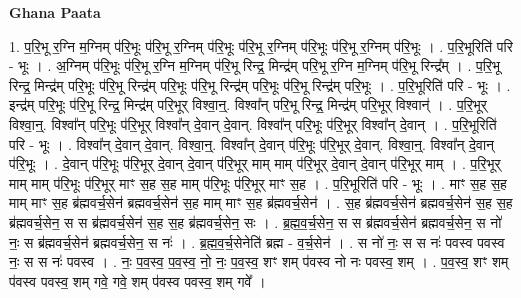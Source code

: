\documentclass[17pt]{extarticle}
\begin{document}
\textbf{Ghana Paata } \newline

1. प॒रि॒भू र॒ग्नि म॒ग्निम् प॑रि॒भूः प॑रि॒भू र॒ग्निम् प॑रि॒भूः प॑रि॒भू र॒ग्निम् प॑रि॒भूः प॑रि॒भू र॒ग्निम् प॑रि॒भूः । . प॒रि॒भूरिति॑ परि - भूः । . अ॒ग्निम् प॑रि॒भूः प॑रि॒भू र॒ग्नि म॒ग्निम् प॑रि॒भू रिन्द्र॒ मिन्द्र॑म् परि॒भू र॒ग्नि म॒ग्निम् प॑रि॒भू रिन्द्र᳚म् । . प॒रि॒भू रिन्द्र॒ मिन्द्र॑म् परि॒भूः प॑रि॒भू रिन्द्र॑म् परि॒भूः प॑रि॒भू रिन्द्र॑म् परि॒भूः प॑रि॒भू रिन्द्र॑म् परि॒भूः । . प॒रि॒भूरिति॑ परि - भूः । . इन्द्र॑म् परि॒भूः प॑रि॒भू रिन्द्र॒ मिन्द्र॑म् परि॒भूर् विश्वा॒न्॒. विश्वा᳚न् परि॒भू रिन्द्र॒ मिन्द्र॑म् परि॒भूर् विश्वान्॑ । . प॒रि॒भूर् विश्वा॒न्॒. विश्वा᳚न् परि॒भूः प॑रि॒भूर् विश्वा᳚न् दे॒वान् दे॒वान्. विश्वा᳚न् परि॒भूः प॑रि॒भूर् विश्वा᳚न् दे॒वान् । . प॒रि॒भूरिति॑ परि - भूः । . विश्वा᳚न् दे॒वान् दे॒वान्. विश्वा॒न्॒. विश्वा᳚न् दे॒वान् प॑रि॒भूः प॑रि॒भूर् दे॒वान्. विश्वा॒न्॒. विश्वा᳚न् दे॒वान् प॑रि॒भूः । . दे॒वान् प॑रि॒भूः प॑रि॒भूर् दे॒वान् दे॒वान् प॑रि॒भूर् माम् माम् प॑रि॒भूर् दे॒वान् दे॒वान् प॑रि॒भूर् माम् । . प॒रि॒भूर् माम् माम् प॑रि॒भूः प॑रि॒भूर् माꣳ स॒ह स॒ह माम् प॑रि॒भूः प॑रि॒भूर् माꣳ स॒ह । . प॒रि॒भूरिति॑ परि - भूः । . माꣳ स॒ह स॒ह माम् माꣳ स॒ह ब्र॑ह्मवर्च॒सेन॑ ब्रह्मवर्च॒सेन॑ स॒ह माम् माꣳ स॒ह ब्र॑ह्मवर्च॒सेन॑ । . स॒ह ब्र॑ह्मवर्च॒सेन॑ ब्रह्मवर्च॒सेन॑ स॒ह स॒ह ब्र॑ह्मवर्च॒सेन॒ स स ब्र॑ह्मवर्च॒सेन॑ स॒ह स॒ह ब्र॑ह्मवर्च॒सेन॒ सः । . ब्र॒ह्म॒व॒र्च॒सेन॒ स स ब्र॑ह्मवर्च॒सेन॑ ब्रह्मवर्च॒सेन॒ स नो॑ नः॒ स ब्र॑ह्मवर्च॒सेन॑ ब्रह्मवर्च॒सेन॒ स नः॑ । . ब्र॒ह्म॒व॒र्च॒सेनेति॑ ब्रह्म - व॒र्च॒सेन॑ । . स नो॑ नः॒ स स नः॑ पवस्व पवस्व नः॒ स स नः॑ पवस्व । . नः॒ प॒व॒स्व॒ प॒व॒स्व॒ नो॒ नः॒ प॒व॒स्व॒ शꣳ शम् प॑वस्व नो नः पवस्व॒ शम् । . प॒व॒स्व॒ शꣳ शम् प॑वस्व पवस्व॒ शम् गवे॒ गवे॒ शम् प॑वस्व पवस्व॒ शम् गवे᳚ । \newline
\end{document}
